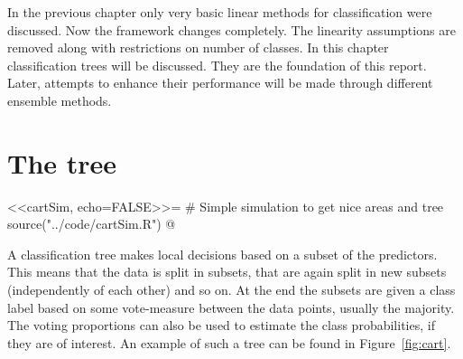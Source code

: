 %
In the previous chapter only very basic linear methods for classification were discussed. 
Now the framework changes completely. The linearity assumptions are removed along with restrictions on number of classes. 
In this chapter classification trees will be discussed. They are the foundation of this report. Later, attempts to enhance their performance will be made through different ensemble methods. 

\section{The tree}
\label{sec:Tree}
<<cartSim, echo=FALSE>>=
# Simple simulation to get nice areas and tree
source("../code/cartSim.R")
@

A classification tree makes local decisions based on a subset of the predictors. This means that the data is split in subsets, that are again split in new subsets (independently of each other) and so on. 
At the end the subsets are given a class label based on some vote-measure between the data points, usually the majority.
The voting proportions can also be used to estimate the class probabilities, if they are of interest.
An example of such a tree can be found in Figure~\ref{fig:cart}.

